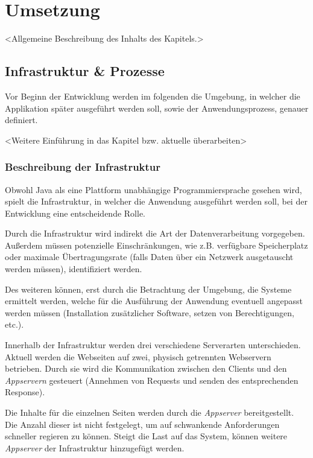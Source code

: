 
\chapter{Umsetzung}\label{cha:Umsetzung}
<Allgemeine Beschreibung des Inhalts des Kapitels.>

\section{Infrastruktur \& Prozesse}
Vor Beginn der Entwicklung werden im folgenden die Umgebung, in welcher die Applikation später ausgeführt werden soll, sowie der Anwendungsprozess, genauer definiert. 

<Weitere Einführung in das Kapitel bzw. aktuelle überarbeiten>

\subsection{Beschreibung der Infrastruktur}
Obwohl Java als eine Plattform unabhängige Programmiersprache gesehen wird, spielt die Infrastruktur, in welcher die Anwendung ausgeführt werden soll, bei der Entwicklung eine entscheidende Rolle.

Durch die Infrastruktur wird indirekt die Art der Datenverarbeitung vorgegeben. Außerdem müssen potenzielle Einschränkungen, wie z.B. verfügbare Speicherplatz oder maximale Übertragungsrate (falls Daten über ein Netzwerk ausgetauscht werden müssen), identifiziert werden.

Des weiteren können, erst durch die Betrachtung der Umgebung, die Systeme ermittelt werden, welche für die Ausführung der Anwendung eventuell angepasst werden müssen (Installation zusätzlicher Software, setzen von Berechtigungen, etc.).

Innerhalb der Infrastruktur werden drei verschiedene Serverarten unterschieden. Aktuell werden die Webseiten auf zwei, physisch getrennten Webservern betrieben. Durch sie wird die Kommunikation zwischen den Clients und den \textit{Appservern} gesteuert (Annehmen von Requests und senden des entsprechenden Response).

Die Inhalte für die einzelnen Seiten werden durch die \textit{Appserver} bereitgestellt. Die Anzahl dieser ist nicht festgelegt, um auf schwankende Anforderungen schneller regieren zu können. Steigt die Last auf das System, können weitere \textit{Appserver} der Infrastruktur hinzugefügt werden.

